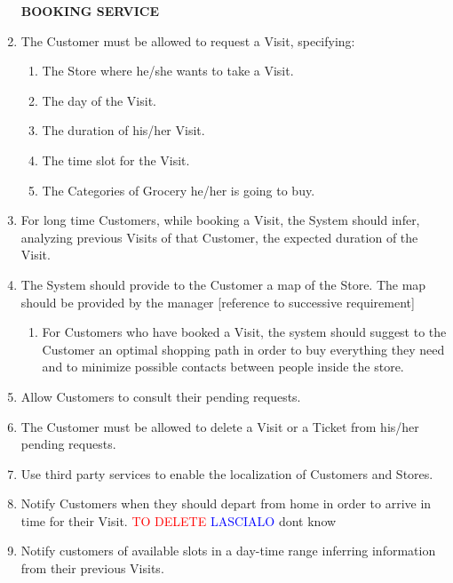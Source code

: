 \documentclass[a4paper, 10pt, oneside]{article}
\newcommand*{\lorenzo}[1]{\textcolor{BurntOrange}{#1}}
\newcommand{\yasmin}[1]{\textcolor{Red}{#1}}
\newcommand{\giovanni}[1]{\textcolor{Blue}{#1}}
\begin{document}
\begin{enumerate}[align=left]
    \item[\textbf{BOOKING SERVICE}]
    \item \label{req:requestVisit}The Customer must be allowed to request a Visit, specifying:
    \begin{enumerate}[label={-}]
        \item \label{req:requestVisit:location}The Store where he/she wants to take a Visit.
        \item \label{req:requestVisit:date}The day of the Visit.
        \item \label{req:requestVisit:duration}The duration of his/her Visit.
        \item \label{req:requestVisit:timeslot}The time slot for the Visit.
        \item \label{req:requestVisit:categoriesToBuy}The Categories of Grocery he/her is going to buy.
    \end{enumerate}
    \item \label{req:statisticForDuration}For long time Customers, while booking a Visit, the System should infer, analyzing previous Visits of that Customer, the expected duration of the Visit.
    \item \label{req:sysProvideMap}The System should provide to the Customer a map of the Store. \lorenzo{The map should be provided by the manager [reference to successive requirement]}
    \begin{enumerate}[label={-}]
        \item \label{req:sysProvideMap:suggestPath}For Customers who have booked a Visit, the system should suggest to the Customer an optimal shopping path in order to buy everything they need and to minimize possible contacts between people inside the store.
    \end{enumerate}
    \item \label{req:seeRequests}Allow Customers to consult their pending requests.
    \item \label{req:deleteTickOrVis}The Customer must be allowed to delete a Visit or a Ticket from his/her pending requests.
    \item \label{req:thirdPartyGPS}Use third party services to enable the localization of Customers and Stores. 
    \item \lorenzo{Notify Customers when they should depart from home in order to arrive in time for their Visit.} \yasmin{TO DELETE} \giovanni{LASCIALO} \lorenzo{dont know} %
    \item \label{req:notifyCustomerOpenSlots}Notify customers of available slots in a day-time range inferring information from their previous Visits.
    

\end{enumerate}
\end{document}
